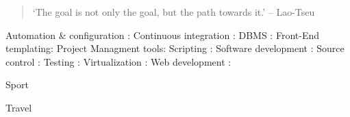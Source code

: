 
\begin{quote}
`The goal is not only the goal,
but the path towards it.' – Lao-Tseu
\end{quote}


Automation & configuration :  
\hfill \break \break
Continuous integration :   
\hfill \break \break
DBMS :   
\hfill \break \break
Front-End templating:  
\hfill \break \break
Project Managment tools:  
\hfill \break \break
Scripting :   
\hfill \break \break
Software development :   
\hfill \break \break
Source control :    
\hfill \break \break
Testing :   
\hfill \break \break
Virtualization :   
\hfill \break \break
Web development :  


\divider

\divider



\medskip
{}

\textmd{Sport} \smallskip
{}
\divider

\textmd{Travel} \smallskip
{}

